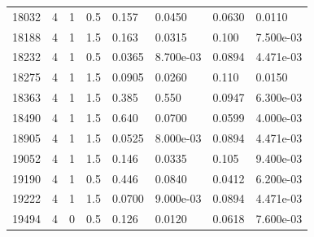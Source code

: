\documentclass[preview]{standalone}
\begin{document}
{{{{\begin{tabular}{L{1.2cm}C{1.2cm} C{0.3cm}C{0.5cm} C{1.4cm}C{1.4cm} C{1.4cm}C{1.4cm}}
  18032  &     4  & 1     & 0.5 &  0.157  & 0.0450  & 0.0630 &  0.0110   \\ 
  18188  &     4  & 1     & 1.5 &  0.163  & 0.0315  & 0.100 &  7.500e-03   \\ 
  18232  &     4  & 1     & 0.5 &  0.0365  & 8.700e-03  & 0.0894 &  4.471e-03   \\ 
  18275  &     4  & 1     & 1.5 &  0.0905  & 0.0260  & 0.110 &  0.0150   \\ 
  18363  &     4  & 1     & 1.5 &  0.385  & 0.550  & 0.0947 &  6.300e-03   \\ 
  18490  &     4  & 1     & 1.5 &  0.640  & 0.0700  & 0.0599 &  4.000e-03   \\ 
  18905  &     4  & 1     & 1.5 &  0.0525  & 8.000e-03  & 0.0894 &  4.471e-03   \\ 
  19052  &     4  & 1     & 1.5 &  0.146  & 0.0335  & 0.105 &  9.400e-03   \\ 
  19190  &     4  & 1     & 0.5 &  0.446  & 0.0840  & 0.0412 &  6.200e-03   \\ 
  19222  &     4  & 1     & 1.5 &  0.0700  & 9.000e-03  & 0.0894 &  4.471e-03   \\ 
  19494  &     4  & 0     & 0.5 &  0.126  & 0.0120  & 0.0618 &  7.600e-03   \\ 
\hline 
\end{tabular} 

}}}}
\end{document}
